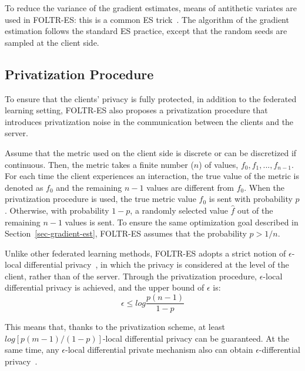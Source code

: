 To reduce the variance of the gradient estimates, means of antithetic variates are used in FOLTR-ES: this is a common ES trick~\cite{salimans2017evolution}. The algorithm of the gradient estimation follows the standard ES practice, except that the random seeds are sampled at the client side.

\subsection{Privatization Procedure}
To ensure that the clients' privacy is fully protected, in addition to the federated learning setting, FOLTR-ES also proposes a privatization procedure that introduces privatization noise in the communication between the clients and the server.

Assume that the metric used on the client side is discrete or can be discretized if continuous. Then, the metric takes a finite number ($n$) of values, $f_0, f_1, ..., f_{n-1}$. For each time the client experiences an interaction, the true value of the metric is denoted as $f_0$ and the remaining $n-1$ values are different from $f_0$. When the privatization procedure is used, the true metric value $f_0$ is sent with probability $p$. Otherwise, with probability $1-p$, a randomly selected value $\hat{f}$ out of the remaining $n-1$ values is sent. To ensure the same optimization goal described in Section~\ref{sec-gradient-est}, FOLTR-ES assumes that the probability $p > 1/n$.

Unlike other federated learning methods, FOLTR-ES adopts a strict notion of $\epsilon$-local differential privacy~\cite{kharitonov2019federated}, in which the privacy is considered at the level of the client, rather than of the server. Through the privatization procedure, $\epsilon$-local differential privacy is achieved, and the upper bound of $\epsilon$ is:
\begin{equation}
	\epsilon \leq log\frac{p(n-1)}{1-p} 
\end{equation}

This means that, thanks to the privatization scheme, at least $log[p(m-1)/(1-p)]$-local differential privacy can be guaranteed. At the same time, any $\epsilon$-local differential private mechanism also can obtain $\epsilon$-differential privacy~\cite{dwork2014algorithmic}.